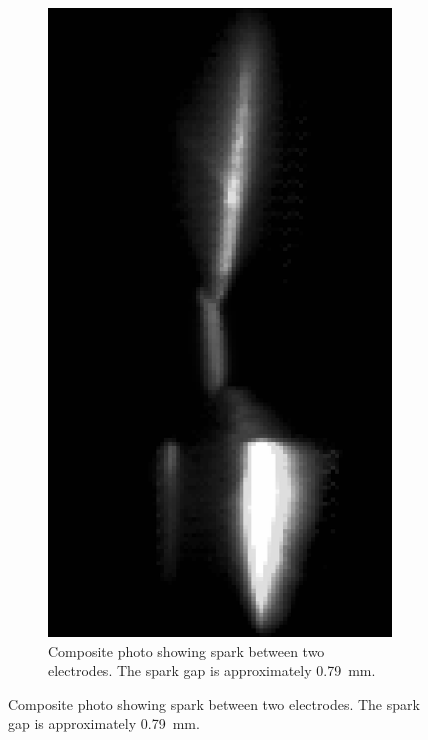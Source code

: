             \begin{figure}[!ht]
                \centering
                \begin{subfigure}[t]{0.25\textwidth}
                    \centering
                    \includegraphics[width=\textwidth]{assets/4 experiments/Composite photo spark.png}
                    \caption{Composite photo showing spark between two electrodes. The spark gap is approximately \qty{0.79}{mm}.}

\end{subfigure}
\end{figure}
